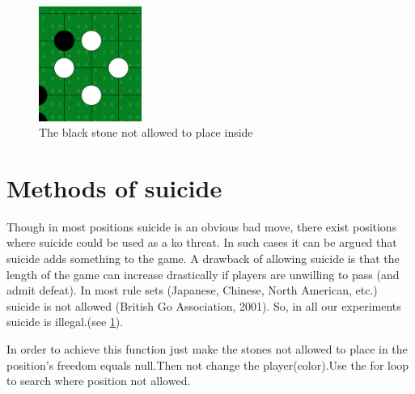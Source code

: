 \documentclass[a4,10pt]{article}
\begin{document}
%
    
         \begin{figure}[tbp]
         \centering
        \includegraphics[width=0.30\textwidth]{gfx/suicide.png}
        \caption{The black stone not allowed to place inside}
        \label{fig:suicide}
        \end{figure}
  \section{Methods of suicide}
Though in most positions suicide is an obvious bad move, there exist positions where suicide could be used as a ko threat.
In such cases it can be argued that suicide adds something to the game. A drawback of allowing suicide is that the length of the game can increase drastically if players are unwilling to pass (and admit defeat). In most rule sets (Japanese, Chinese, North American, etc.)
suicide is not allowed (British Go Association, 2001). So, in all our experiments suicide is illegal.\cite{werf:2003}(see \cref{fig:suicide}).

In order to achieve this function just make the stones not allowed to place in the position's freedom equals null.Then
not change the player(color).Use the for loop to search where position not allowed.
\end{document}
